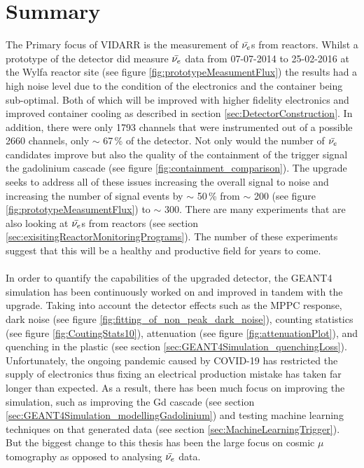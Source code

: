 
\chapter{Summary}

\ifpdf
    \graphicspath{{Chapter6/Figs/Raster/}{Chapter6/Figs/PDF/}{Chapter6/Figs/}}
\else
    \graphicspath{{Chapter6/Figs/Vector/}{Chapter6/Figs/}}
\fi

The Primary focus of VIDARR is the measurement of $\Bar{\nu_e}$s from reactors. Whilst a prototype of the detector did measure $\Bar{\nu_e}$ data from 07-07-2014 to 25-02-2016 at the Wylfa reactor site (see figure \ref{fig:prototypeMeasumentFlux}) the results had a high noise level due to the condition of the electronics and the container being sub-optimal. Both of which will be improved with higher fidelity electronics and improved container cooling as described in section \ref{sec:DetectorConstruction}. In addition, there were only 1793 channels that were instrumented out of a possible 2660 channels, only $\sim$ 67\,\% of the detector. Not only would the number of $\Bar{\nu_e}$ candidates improve but also the quality of the containment of the trigger signal the gadolinium cascade (see figure \ref{fig:containment_comparison}). The upgrade seeks to address all of these issues increasing the overall signal to noise and increasing the number of signal events by $\sim$ 50\,\% from $\sim$ 200 (see figure \ref{fig:prototypeMeasumentFlux}) to $\sim$ 300. There are many experiments that are also looking at $\Bar{\nu_e}$s from reactors (see section \ref{sec:exisitingReactorMonitoringPrograms}). The number of these experiments suggest that this will be a healthy and productive field for years to come.
\\\\In order to quantify the capabilities of the upgraded detector, the GEANT4 simulation has been continuously worked on and improved in tandem with the upgrade. Taking into account the detector effects such as the MPPC response, dark noise (see figure \ref{fig:fitting_of_non_peak_dark_noise}), counting statistics (see figure \ref{fig:CoutingStats10}), attenuation (see figure \ref{fig:attenuationPlot}), and quenching in the plastic (see section \ref{sec:GEANT4Simulation_quenchingLoss}). Unfortunately, the ongoing pandemic caused by COVID-19 has restricted the supply of electronics thus fixing an electrical production mistake has taken far longer than expected. As a result, there has been much focus on improving the simulation, such as improving the Gd cascade (see section \ref{sec:GEANT4Simulation_modellingGadolinium}) and testing machine learning techniques on that generated data (see section \ref{sec:MachineLearningTrigger}). But the biggest change to this thesis has been the large focus on cosmic $\mu$ tomography as opposed to analysing $\Bar{\nu_e}$ data.
